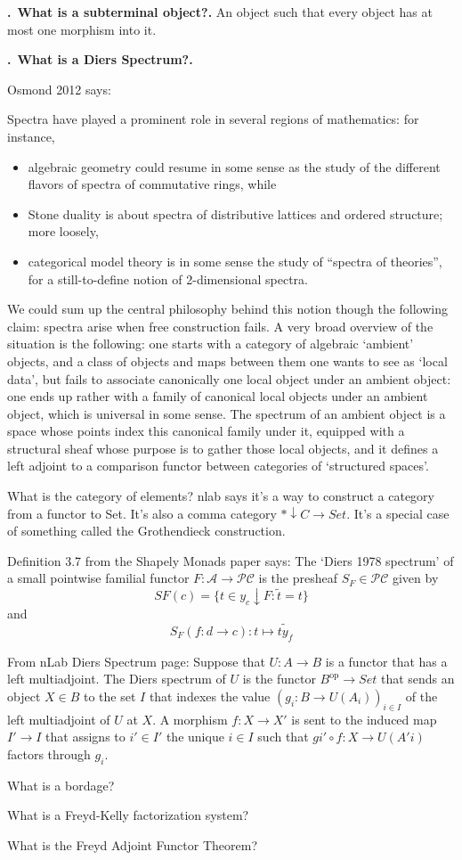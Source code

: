 \documentclass[11pt,noamsfonts]{amsart}
\newcommand{\pointheader}{\vspace{2mm}\noindent\refstepcounter{section}\textbf{\thesection.}}
\newcommand{\bpoint}[1]{\pointheader~{\bf #1.}}
\DeclareMathOperator{\op}{op}
\begin{document}
\bpoint{What is a subterminal object?} An object such that every object has at most one morphism into it.

\bpoint{What is a Diers Spectrum?}

Osmond 2012 says:

Spectra have played a prominent role in several regions of mathematics: for instance, 
\begin{itemize}
\item algebraic geometry could resume in some sense as the study of the different flavors of spectra of commutative rings, while 
\item Stone duality is about spectra of distributive lattices and ordered structure; more loosely,
\item categorical model theory is in some sense the study of “spectra of theories”, for a still-to-define notion of 2-dimensional spectra.
\end{itemize} We could sum up the central philosophy behind this notion though
the following claim: spectra arise when free construction fails. A very broad overview of the situation is the following: one starts with a category of algebraic `ambient' objects, and a class of
objects and maps between them one wants to see as `local data', but fails to associate canonically
one local object under an ambient object: one ends up rather with a family of canonical local
objects under an ambient object, which is universal in some sense. The spectrum of an ambient
object is a space whose points index this canonical family under it, equipped with a structural
sheaf whose purpose is to gather those local objects, and it defines a left adjoint to a comparison
functor between categories of `structured spaces'.

What is the category of elements? nlab says it's a way to construct a category from a functor to Set. It's also a comma category \( * \downarrow C \to Set \). It's a special case of something called the Grothendieck construction. 

Definition 3.7 from the Shapely Monads paper says: The `Diers 1978 spectrum' of a small pointwise familial functor 
\(F : \mathcal{A} \to \mathcal{PC}\) is the presheaf \(S_F \in \mathcal{PC}\) given by
\[
SF (c) = \{ t \in y_c \downarrow F : \tilde{t} = t \}
\]
and
\[
S_F (f : d \to c) : t \mapsto \tilde{t y_f}
\]

From nLab Diers Spectrum page: Suppose that \(U: A \to B\)
is a functor that has a left multiadjoint.
The Diers spectrum of \(U\) is the functor
\(B^{\op} \to Set\) that sends an object
\( X \in B \) to the set
\( I \) that indexes the value
\( (g_i : B \to U(A_i))_{i \in I} \)
of the left multiadjoint of \( U \) at
\( X \). A morphism
\( f : X \to X' \) is sent to the induced map \( I' \to I \) that assigns to \( i' \in I' \) the unique \( i \in I \) such that \( g i' \circ f : X \to U( A' i ) \) factors through \( g_i \).


What is a bordage?

What is a Freyd-Kelly factorization system?

What is the Freyd Adjoint Functor Theorem?
\end{document}
